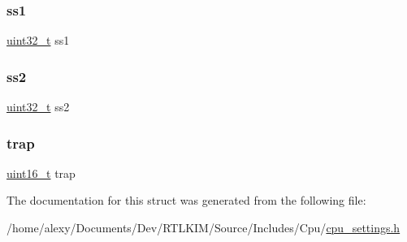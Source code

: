 \subsubsection{\texorpdfstring{ss1}{ss1}}
{\footnotesize\ttfamily \hyperlink{stdint_8h_a324c5d28c0d82f502a234ab99efac87a}{uint32\+\_\+t} ss1}

\mbox{\label{structcpu__tss__entry_ac96ed21da44a3e051bf3cd7d4f186c1e}} 
\subsubsection{\texorpdfstring{ss2}{ss2}}
{\footnotesize\ttfamily \hyperlink{stdint_8h_a324c5d28c0d82f502a234ab99efac87a}{uint32\+\_\+t} ss2}

\mbox{\label{structcpu__tss__entry_a9375f4a9360efc8d2a1805b676967567}} 
\subsubsection{\texorpdfstring{trap}{trap}}
{\footnotesize\ttfamily \hyperlink{stdint_8h_a273cf69d639a59973b6019625df33e30}{uint16\+\_\+t} trap}



The documentation for this struct was generated from the following file\+:\begin{DoxyCompactItemize}
\item 
/home/alexy/\+Documents/\+Dev/\+R\+T\+L\+K\+I\+M/\+Source/\+Includes/\+Cpu/\hyperlink{cpu__settings_8h}{cpu\+\_\+settings.\+h}\end{DoxyCompactItemize}
